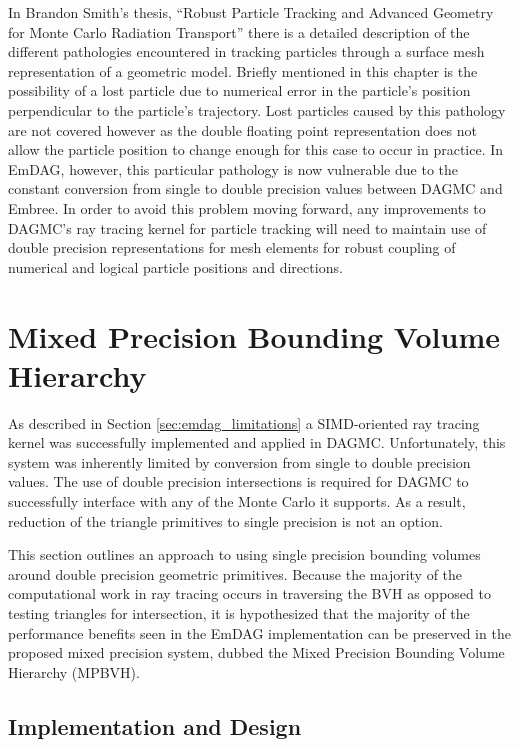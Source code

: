In Brandon Smith's thesis, ``Robust Particle Tracking and Advanced Geometry for
Monte Carlo Radiation Transport'' \cite{Smith_2011} there is a detailed
description of the different pathologies encountered in tracking particles
through a surface mesh representation of a geometric model. Briefly mentioned in
this chapter is the possibility of a lost particle due to numerical error in the
particle's position perpendicular to the particle's trajectory. Lost particles
caused by this pathology are not covered however as the double floating point
representation does not allow the particle position to change enough for this
case to occur in practice. In EmDAG, however, this particular pathology is now
vulnerable due to the constant conversion from single to double precision values
between DAGMC and Embree. In order to avoid this problem moving forward, any
improvements to DAGMC's ray tracing kernel for particle tracking will need to
maintain use of double precision representations for mesh elements for robust
coupling of numerical and logical particle positions and directions.

\section{Mixed Precision Bounding Volume Hierarchy}

As described in Section \ref{sec:emdag_limitations} a SIMD-oriented ray tracing
kernel was successfully implemented and applied in DAGMC. Unfortunately, this
system was inherently limited by conversion from single to double precision
values. The use of double precision intersections is required for DAGMC to
successfully interface with any of the Monte Carlo it supports. As a result,
reduction of the triangle primitives to single precision is not an option.

This section outlines an approach to using single precision bounding volumes
around double precision geometric primitives. Because the majority of the
computational work in ray tracing occurs in traversing the BVH as opposed to
testing triangles for intersection, it is hypothesized that the majority of the
performance benefits seen in the EmDAG implementation can be preserved in the
proposed mixed precision system, dubbed the Mixed Precision Bounding Volume
Hierarchy (MPBVH).

\subsection{Implementation and Design}

